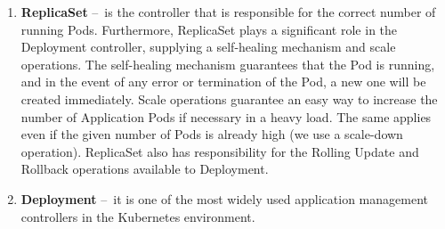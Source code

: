 \begin{enumerate}
    \item \textbf{ReplicaSet} \---\ is the controller that is responsible for the correct number of running Pods.
    Furthermore, ReplicaSet plays a significant role in the Deployment controller, supplying a self-healing mechanism and scale operations.
    The self-healing mechanism guarantees that the Pod is running, and in the event of any error or termination of the Pod, a new one will be created immediately.
    Scale operations guarantee an easy way to increase the number of Application Pods if necessary in a heavy load.
    The same applies even if the given number of Pods is already high (we use a scale-down operation).
    ReplicaSet also has responsibility for the Rolling Update and Rollback operations available to Deployment.

    \item \textbf{Deployment} \---\ it is one of the most widely used application management controllers in the Kubernetes environment.


\end{enumerate}
